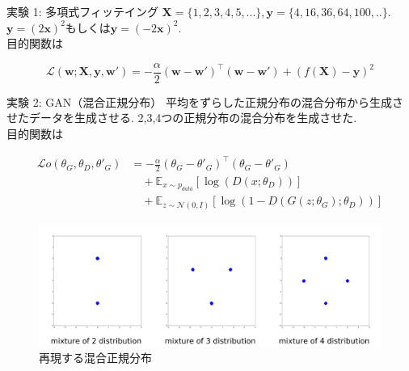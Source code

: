\documentclass[dvipdfmx,12pt,unicode]{beamer}
\begin{document}
\begin{frame}{実験 1: 多項式フィッテイング}
  $\pmb{X} = \{1, 2, 3, 4, 5,...\}, \pmb{y} = \{4, 16, 36, 64, 100,..\}$. \\
  $\pmb{y} = (2\pmb{x})^{2}$もしくは$\pmb{y} = (-2\pmb{x})^{2}$. \\
  目的関数は
  
  \begin{equation}
    \label{regression}
    \mathcal{L}(\pmb{w}; \pmb{X}, \pmb{y}, \pmb{w}')
    =  -\frac{\alpha}{2} (\pmb{w} - \pmb{w}')^{\top}(\pmb{w} - \pmb{w}') + (f(\pmb{X}) - \pmb{y})^{2} 
  \end{equation}      
\end{frame}

\begin{frame}{実験 2: GAN（混合正規分布）} 
  平均をずらした正規分布の混合分布から生成させたデータを生成させる. 
  2,3,4つの正規分布の混合分布を生成させた. \\
  目的関数は
  
  \begin{equation}
    \begin{split}
    \label{gan}
    \mathcal{L}o(\theta_{G}, \theta_{D}, \theta'_{G})
    & =  -\frac{\alpha}{2} (\theta_{G} - \theta'_{G})^{\top}(\theta_{G} - \theta'_{G})  \\
    & \quad +  \mathbb{E}_{x\sim p_{data}} [ \log(D(x; \theta_{D})) ]    \\ 
    & \quad + \mathbb{E}_{z\sim \mathcal{N}(0, I)} [ \log(1 - D(G(z;\theta_{G}); \theta_{D})) ]
    \end{split}
  \end{equation}        
\end{frame}

\begin{frame}
  \begin{figure}[htb]
    \centering    
    \includegraphics[width=\linewidth]{true.png}
    \caption{再現する混合正規分布}
  \end{figure}
\end{frame}
\end{document}
